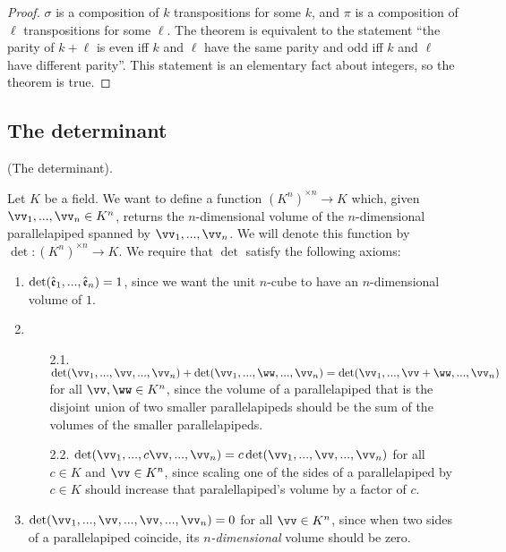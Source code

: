 \begin{proof}
    $\sigma$ is a composition of $k$ transpositions for some $k$, and $\pi$ is a composition of $\ell$ transpositions for some $\ell$. The theorem is equivalent to the statement ``the parity of $k + \ell$ is even iff $k$ and $\ell$ have the same parity and odd iff $k$ and $\ell$ have different parity''. This statement is an elementary fact about integers, so the theorem is true.
\end{proof}

\newpage

\subsection*{The determinant}

\begin{defn}
\label{ch::lin_alg::defn::determinant}
    (The determinant).
    
    Let $K$ be a field. We want to define a function $(K^n)^{\times n} \rightarrow K$ which, given $\vv_1, ..., \vv_n \in K^n$, returns the $n$-dimensional volume of the $n$-dimensional parallelapiped spanned by $\vv_1, ..., \vv_n$. We will denote this function by $\det:(K^n)^{\times n} \rightarrow K$. We require that $\det$ satisfy the following axioms:
    
    \begin{enumerate}
        \item $\det(\hat{\mathfrak{e}}_1, ..., \hat{\mathfrak{e}}_n) = 1$, since we want the unit $n$-cube to have an $n$-dimensional volume of $1$.
        \item
        \begin{enumerate}
            \item[2.1.]
            $\det(\vv_1, ..., \vv, ..., \vv_n) + \det(\vv_1, ..., \ww, ..., \vv_n) = \det(\vv_1, ..., \vv + \ww, ..., \vv_n)$ for all $\vv, \ww \in K^n$, since the volume of a parallelapiped that is the disjoint union of two smaller parallelapipeds should be the sum of the volumes of the smaller parallelapipeds.
            \item[2.2.] $\det(\vv_1, ..., c\vv, ..., \vv_n) = c\det(\vv_1, ..., \vv, ..., \vv_n)$ for all $c \in K$ and $\vv \in K^n$, since scaling one of the sides of a parallelapiped by $c \in K$ should increase that paralellapiped's volume by a factor of $c$. 
        \end{enumerate}
        \item $\det(\vv_1, ..., \vv, ..., \vv, ..., \vv_n) = 0$ for all $\vv \in K^n$, since when two sides of a parallelapiped coincide, its \textit{$n$-dimensional} volume should be zero.
    \end{enumerate}
\end{defn}

